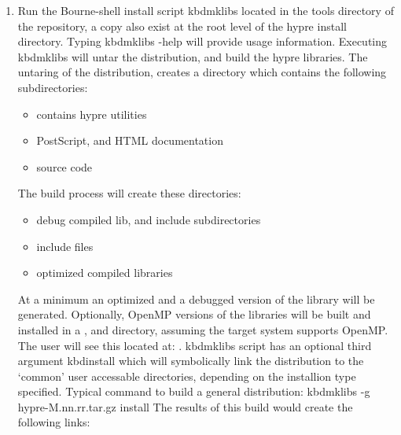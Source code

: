\begin{enumerate}
   \item Run the Bourne-shell install script kbd{mklibs} located in 
   the tools directory of the \hypre{} repository, a copy also
   exist at the root level of the hypre install directory. Typing
   kbd{mklibs -help} will provide usage information. Executing
   kbd{mklibs} will untar the distribution, and build the hypre 
   libraries. The untaring of the distribution, creates a directory
    which contains the following subdirectories:
      \begin{itemize}
       \item {}     contains hypre utilities
       \item {}    PostScript, and HTML documentation
       \item {}     source code
      \end{itemize}
   The build process will create these directories:
      \begin{itemize}
       \item {}   debug compiled lib, and include subdirectories
       \item {} include files
       \item {}     optimized compiled libraries
      \end{itemize}
   At a minimum an optimized and a debugged version of the library will
   be generated. Optionally, OpenMP versions of the libraries will
   be built and installed in a , and 
   directory, assuming the target system supports OpenMP. The
   user will see this located at: .
   kbd{mklibs} script has an optional third argument kbd{install} which 
   will symbolically link the distribution to the `common' user
   accessable directories, depending on the installion type
   specified. Typical command to build a general distribution:\linebreak
   kbd{mklibs -g hypre-M.nn.rr.tar.gz install}\linebreak
   The results of this build would create the following links:\linebreak
   \linebreak
   \linebreak
   \linebreak

\end{enumerate}

